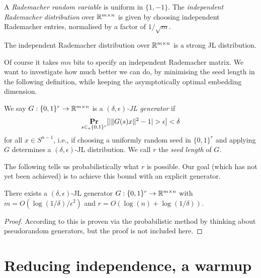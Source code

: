 \begin{definitions}
  A \emph{Rademacher random variable} is uniform in $\{1,-1\}$. The
  \emph{independent Rademacher distribution} over $\mathbb{R}^{m \times n}$ is
  given by choosing independent Rademacher entries, normalised by a
  factor of $1/\sqrt{m}$.
\end{definitions}

\begin{theorem}
  \label{rademacher-JL}
  The independent Rademacher distribution over $\mathbb{R}^{m \times n}$ is a
  strong JL distribution.
\end{theorem}

Of course it takes $mn$ bits to specify an independent Rademacher
matrix. We want to investigate how much better we can do, by
minimising the seed length in the following definition, while keeping
the asymptotically optimal embedding dimension.

\begin{definition}
  We say $G : \{0,1\}^r \to \mathbb{R}^{m \times n}$ is a
  \emph{$(\delta,\epsilon)$-JL generator} if
  \[
  \operatorname*{\mathbf{Pr}}_{s \in_u \{0,1\}^r}[|\|G(s)x\|^2 - 1| > \epsilon] < \delta
  \]
  for all $x \in S^{n-1}$, i.e., if choosing a uniformly random seed
  in $\{0,1\}^r$ and applying $G$ determines a $(\delta,\epsilon)$-JL
  distribution. We call $r$ the \emph{seed length} of $G$.
\end{definition}

The following tells us probabilistically what $r$ is possible. Our
goal (which has not yet been achieved) is to achieve this bound with
an explicit generator.

\begin{proposition}
  There exists a $(\delta,\epsilon)$-JL generator $G : \{0,1\}^r \to
  \mathbb{R}^{m \times n}$ with $m = O(\log(1/\delta)/\epsilon^2)$ and $r =
  O(\log(n) + \log(1/\delta))$.
\end{proposition}

\begin{proof}
  According to \cite{nelson-2011} this is proven via the probabilistic
  method by thinking about pseudorandom generators, but the proof is
  not included here.
\end{proof}


\section{Reducing independence, a warmup}

